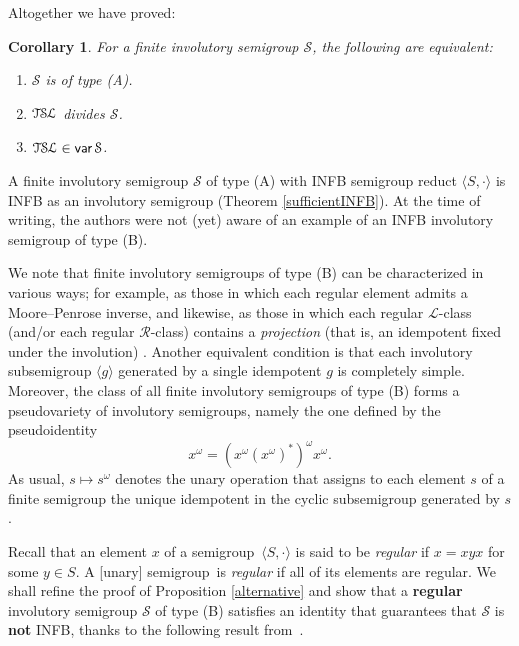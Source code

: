 \documentclass[11pt,reqno]{amsart}
\def\Rc{\mathrel{\mathscr{R}}}
\def\Lc{\mathrel{\mathscr{L}}}
\newcommand{\sgp}{semi\-group}
\newcommand{\TSL}{\ensuremath{\mathcal{T\kern-.5pt S\kern-.5pt L}}}
\newtheorem{Cor}[Thm]{Corollary}
\DeclareMathOperator{\var}{\mathsf{var}}
\begin{document}
Altogether we have proved:
\begin{Cor}\label{TSLinvarS} For a finite involutory semigroup $\mathcal{S}$, the following are equivalent:
\begin{enumerate}
\item $\mathcal{S}$ is of type (A).
\item $\TSL$ divides $\mathcal{S}$.
\item $\TSL\in \var\mathcal{S}$.
\end{enumerate}
\end{Cor}

A finite involutory semigroup $\mathcal{S}$ of type (A) with INFB semigroup reduct $\langle S,\cdot\rangle$ is INFB as
an involutory semigroup (Theorem \ref{sufficientINFB}). At the time of writing, the authors were not (yet) aware of an
example of an INFB involutory semigroup of type (B).

We note that finite involutory semigroups of type (B) can be characterized in various ways; for example, as those in which each regular
element admits a Moore--Penrose inverse, and likewise, as those in which each regular ${\Lc}$-class (and/or each regular ${\Rc}$-class)
contains a \emph{projection} (that is, an idempotent fixed under the involution) \cite{NP}. Another equivalent condition is that each
involutory subsemigroup $\langle g\rangle$ generated by a single idempotent $g$ is completely simple. Moreover, the class of all finite
involutory semigroups of type (B) forms a pseudovariety of involutory semigroups, namely the one defined by the pseudoidentity
$$x^\omega=(x^\omega(x^\omega)^*)^\omega x^\omega.$$
As usual, $s\mapsto s^\omega$ denotes the unary operation that assigns to each element $s$ of a finite semigroup the unique idempotent in
the cyclic subsemigroup generated by $s$.

Recall that an element $x$ of a \sgp\ $\langle S,\cdot\rangle$ is said to be \emph{regular} if $x=xyx$ for some $y\in S$. A [unary] \sgp\
is \emph{regular} if all of its elements are regular. We shall refine the proof of Proposition \ref{alternative} and show that a
\textbf{regular} involutory semigroup $\mathcal{S}$ of type (B) satisfies an identity that guarantees that $\mathcal{S}$ is \textbf{not}
INFB, thanks to the following result from~\cite{ADV:2012}.
\end{document}
